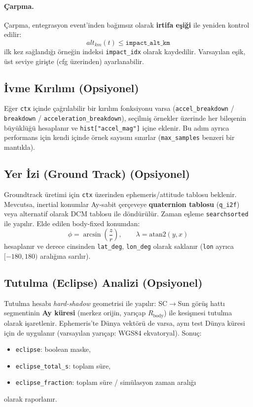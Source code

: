 \paragraph{Çarpma.}
Çarpma, entegrasyon event’inden bağımsız olarak \textbf{irtifa eşiği} ile yeniden kontrol edilir:
\[
alt_{km}(t) \le \texttt{impact\_alt\_km}
\]
ilk kez sağlandığı örneğin indeksi \texttt{impact\_idx} olarak kaydedilir. Varsayılan eşik, üst seviye girişte (cfg üzerinden) ayarlanabilir. 


\subsection*{İvme Kırılımı (Opsiyonel)}

Eğer \texttt{ctx} içinde çağrılabilir bir kırılım fonksiyonu varsa
(\texttt{accel\_breakdown} / \texttt{breakdown} / \texttt{acceleration\_breakdown}),
seçilmiş örnekler üzerinde her bileşenin büyüklüğü hesaplanır ve
\texttt{hist["accel\_mag"]} içine eklenir.
Bu adım ayrıca performans için kendi içinde örnek sayısını sınırlar
(\texttt{max\_samples} benzeri bir mantıkla). 


\subsection*{Yer İzi (Ground Track) (Opsiyonel)}

Groundtrack üretimi için \texttt{ctx} üzerinden ephemeris/attitude tablosu beklenir.
Mevcutsa, inertial konumlar Ay-sabit çerçeveye
\textbf{quaternion tablosu} (\texttt{q\_i2f}) veya alternatif olarak
DCM tablosu ile döndürülür. Zaman eşleme \texttt{searchsorted} ile yapılır.
Elde edilen body-fixed konumdan:
\[
\phi=\arcsin\!\left(\frac{z}{r}\right), \qquad
\lambda=\mathrm{atan2}(y,x)
\]
hesaplanır ve derece cinsinden \texttt{lat\_deg}, \texttt{lon\_deg} olarak saklanır
(\texttt{lon} ayrıca $[-180,180)$ aralığına sarılır). 


\subsection*{Tutulma (Eclipse) Analizi (Opsiyonel)}

Tutulma hesabı \emph{hard-shadow} geometrisi ile yapılır:
SC$\rightarrow$Sun görüş hattı segmentinin
\textbf{Ay küresi} (merkez orijin, yarıçap $R_\text{body}$) ile kesişmesi tutulma olarak işaretlenir.
Ephemeris’te Dünya vektörü de varsa, aynı test Dünya küresi için de uygulanır (varsayılan yarıçap: WGS84 ekvatoryal).
Sonuç:
\begin{itemize}
  \item \texttt{eclipse}: boolean maske,
  \item \texttt{eclipse\_total\_s}: toplam süre,
  \item \texttt{eclipse\_fraction}: toplam süre / simülasyon zaman aralığı
\end{itemize}
olarak raporlanır. 


